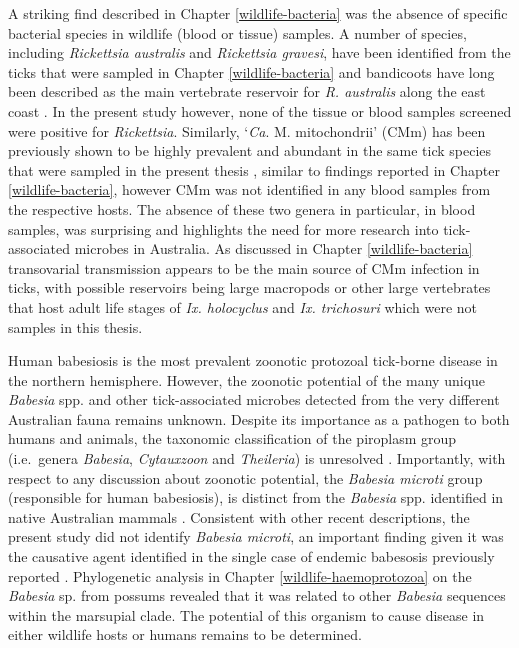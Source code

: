 \documentclass[a4paper, nobind]{templates/ociamthesis}
\begin{document}
A striking find described in Chapter \ref{wildlife-bacteria} was the absence of specific bacterial species in wildlife (blood or tissue) samples.
A number of species, including \emph{Rickettsia australis} and \emph{Rickettsia gravesi}, have been identified from the ticks that were sampled in Chapter \ref{wildlife-bacteria} and bandicoots have long been described as the main vertebrate reservoir for \emph{R. australis} along the east coast \autocite{campbellRickettsiosesAustraliaIsolation1974,sextonSpottedFeverGroup1991}.
In the present study however, none of the tissue or blood samples screened were positive for \emph{Rickettsia}.
Similarly, `\emph{Ca}. M. mitochondrii' (CMm) has been previously shown to be highly prevalent and abundant in the same tick species that were sampled in the present thesis \autocite{goftonInhibitionEndosymbiontCandidatus2015,eganBacterialCommunityProfiling2020}, similar to findings reported in Chapter \ref{wildlife-bacteria}, however CMm was not identified in any blood samples from the respective hosts.
The absence of these two genera in particular, in blood samples, was surprising and highlights the need for more research into tick-associated microbes in Australia.
As discussed in Chapter \ref{wildlife-bacteria} transovarial transmission appears to be the main source of CMm infection in ticks, with possible reservoirs being large macropods or other large vertebrates that host adult life stages of \emph{Ix. holocyclus} and \emph{Ix. trichosuri} which were not samples in this thesis.

Human babesiosis is the most prevalent zoonotic protozoal tick-borne disease in the northern hemisphere.
However, the zoonotic potential of the many unique \emph{Babesia} spp. and other tick-associated microbes detected from the very different Australian fauna remains unknown.
Despite its importance as a pathogen to both humans and animals, the taxonomic classification of the piroplasm group (i.e.~genera \emph{Babesia}, \emph{Cytauxzoon} and \emph{Theileria}) is unresolved \autocite{papariniFirstMolecularCharacterization2015,schreegMitochondrialGenomeSequences2016,barbosaSequenceAnalysesMitochondrial2019}.
Importantly, with respect to any discussion about zoonotic potential, the \emph{Babesia microti} group (responsible for human babesiosis), is distinct from the \emph{Babesia} spp. identified in native Australian mammals \autocite{schreegMitochondrialGenomeSequences2016,barbosaSequenceAnalysesMitochondrial2019}.
Consistent with other recent descriptions, the present study did not identify \emph{Babesia microti}, an important finding given it was the causative agent identified in the single case of endemic babesosis previously reported \autocite{senanayakeFirstReportHuman2012}.
Phylogenetic analysis in Chapter \ref{wildlife-haemoprotozoa} on the \emph{Babesia} sp. from possums revealed that it was related to other \emph{Babesia} sequences within the marsupial clade.
The potential of this organism to cause disease in either wildlife hosts or humans remains to be determined.
\end{document}
